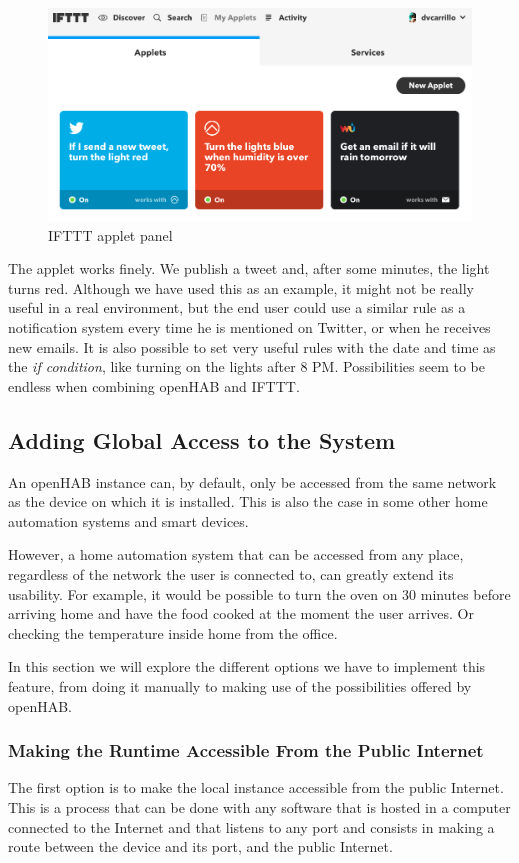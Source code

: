 \begin{figure}
	\centering
	\includegraphics[width=1\textwidth]{images/Chapter_06/iftt-applet-panel.png}
	\caption{IFTTT applet panel}
	\label{fig:iftt-applet-panel}
\end{figure}

The applet works finely. We publish a tweet and, after some minutes, the light turns red. Although we have used this as an example,
it might not be really useful in a real environment, but the end user could use a similar rule as a notification system every time
he is mentioned on Twitter, or when he receives new emails. It is also possible to set very useful rules with the date and time as
the \textit{if condition}, like turning on the lights after 8 PM. Possibilities seem to be endless when combining openHAB and IFTTT.

\subsection{Adding Global Access to the System}
An openHAB instance can, by default, only be accessed from the same network as the device on which it is installed. This is also
the case in some other home automation systems and smart devices.

However, a home automation system that can be accessed from any place, regardless of the network the user is connected to, can
greatly extend its usability. For example, it would be possible to turn the oven on 30 minutes before arriving home and have the
food cooked at the moment the user arrives. Or checking the temperature inside home from the office.

In this section we will explore the different options we have to implement this feature, from doing it manually to making use of
the possibilities offered by openHAB.

\subsubsection{Making the Runtime Accessible From the Public Internet}
The first option is to make the local instance accessible from the public Internet. This is a process that can be done with any
software that is hosted in a computer connected to the Internet and that listens to any port and consists in making a route
between the device and its port, and the public Internet.\cite{nchPublicInternet}

